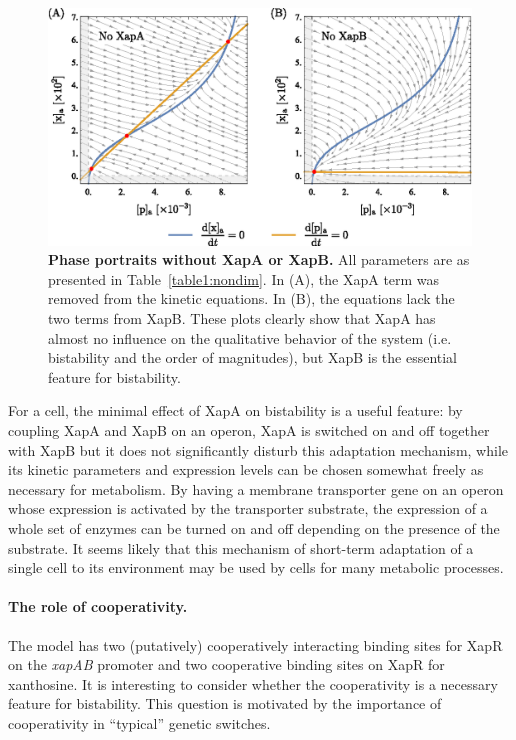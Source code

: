 \documentclass[10pt,letterpaper]{article}
\begin{document}
	\begin{figure}%
		\centering
		\includegraphics{media/Fig6_xapAB.eps}
		\caption{{\bf Phase portraits without XapA or XapB.}
			All parameters are as presented in Table~\ref{table1:nondim}. In
			(A), the XapA term was removed from the kinetic equations. In (B),
			the equations lack the two terms from XapB. These plots clearly show
			that XapA has almost no influence on the qualitative behavior of the
			system (i.e. bistability and the order of magnitudes), but XapB is
			the essential feature for bistability.}
		\label{fig6:xapAB}
	\end{figure}
	
	For a cell, the minimal effect of XapA on bistability is a useful feature: by coupling XapA and XapB on an
	operon, XapA is switched on and off together with XapB but it does not
	significantly disturb this adaptation mechanism, while its kinetic
	parameters and expression levels can be chosen 
	somewhat freely as necessary for metabolism. By
	having a membrane transporter gene on an operon whose expression is
	activated by the transporter substrate, the expression of a whole set of
	enzymes can be turned on and off depending on the presence of the substrate.
	It seems likely that this mechanism of short-term adaptation of a single cell to
	its environment may be used by cells for many metabolic processes.
	
	\paragraph*{The role of cooperativity.} 
	The model has two (putatively) cooperatively interacting binding sites for XapR on the
	\emph{xapAB} promoter and two cooperative binding sites on XapR for
	xanthosine. It is interesting to consider whether the cooperativity is
	a necessary feature for bistability. This question is motivated by the importance of
	cooperativity in ``typical'' genetic switches\cite{Gardner2000,Cherry2000}.
	
\end{document}
